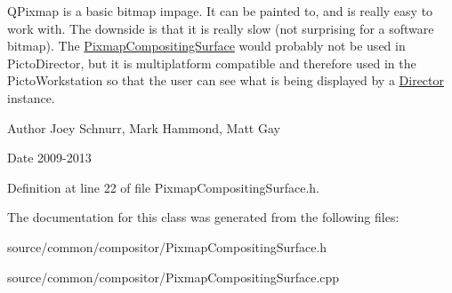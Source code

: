 Q\-Pixmap is a basic bitmap impage. It can be painted to, and is really easy to work with. The downside is that it is really slow (not surprising for a software bitmap). The \hyperlink{class_picto_1_1_pixmap_compositing_surface}{Pixmap\-Compositing\-Surface} would probably not be used in Picto\-Director, but it is multiplatform compatible and therefore used in the Picto\-Workstation so that the user can see what is being displayed by a \hyperlink{class_director}{Director} instance. \begin{DoxyAuthor}{Author}
Joey Schnurr, Mark Hammond, Matt Gay 
\end{DoxyAuthor}
\begin{DoxyDate}{Date}
2009-\/2013 
\end{DoxyDate}


Definition at line 22 of file Pixmap\-Compositing\-Surface.\-h.



The documentation for this class was generated from the following files\-:\begin{DoxyCompactItemize}
\item 
source/common/compositor/Pixmap\-Compositing\-Surface.\-h\item 
source/common/compositor/Pixmap\-Compositing\-Surface.\-cpp\end{DoxyCompactItemize}
